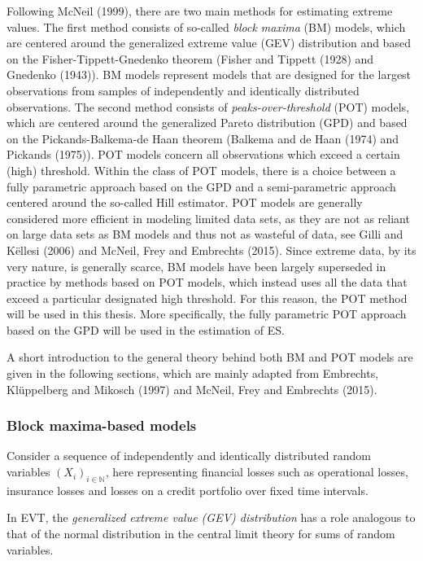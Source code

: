 \documentclass[a4paper,11pt]{article}
\theoremstyle{definition}
\theoremstyle{definition}
\theoremstyle{definition}
\theoremstyle{definition}
\theoremstyle{remark}
\begin{document}
Following McNeil (1999), there are two main methods for estimating extreme values. The first method consists of so-called \emph{block maxima} (BM) models, which are centered around the generalized extreme value (GEV) distribution and based on the Fisher-Tippett-Gnedenko theorem (Fisher and Tippett (1928) and Gnedenko (1943)). BM models represent models that are designed for the largest observations from samples of independently and identically distributed observations. The second method consists of \emph{peaks-over-threshold} (POT) models, which are centered around the generalized Pareto distribution (GPD) and based on the Pickands-Balkema-de Haan theorem (Balkema and de Haan (1974) and Pickands (1975)). POT models concern all observations which exceed a certain (high) threshold. Within the class of POT models, there is a choice between a fully parametric approach based on the GPD and a semi-parametric approach centered around the so-called Hill estimator. POT models are generally considered more efficient in modeling limited data sets, as they are not as reliant on large data sets as BM models and thus not as wasteful of data, see Gilli and Këllesi (2006) and McNeil, Frey and Embrechts (2015). Since extreme data, by its very nature, is generally scarce, BM models have been largely superseded in practice by methods based on POT models, which instead uses all the data that exceed a particular designated high threshold. For this reason, the POT method will be used in this thesis. More specifically, the fully parametric POT approach based on the GPD will be used in the estimation of ES.

A short introduction to the general theory behind both BM and POT models are given in the following sections, which are mainly adapted from Embrechts, Klüppelberg and Mikosch (1997) and McNeil, Frey and Embrechts (2015).

\hypertarget{block-maxima-based-models}{%
\subsubsection{Block maxima-based models}\label{block-maxima-based-models}}

Consider a sequence of independently and identically distributed random variables \((X_i)_{i \in \mathbb N}\), here representing financial losses such as operational losses, insurance losses and losses on a credit portfolio over fixed time intervals.

In EVT, the \emph{generalized extreme value (GEV) distribution} has a role analogous to that of the normal distribution in the central limit theory for sums of random variables.
\end{document}
